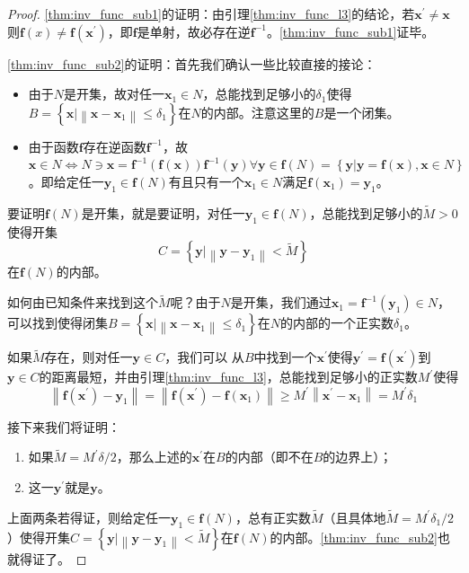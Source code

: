 \documentclass[../main.tex]{subfiles}
\begin{document}
\begin{proof}
    \ref{thm:inv_func_sub1}的证明：由引理\ref{thm:inv_func_l3}的结论，若$\mathbf{x}^\prime\neq\mathbf{x}$则$\mathbf{f}\left(x\right)\neq\mathbf{f}\left(\mathbf{x}^\prime\right)$，即$\mathbf{f}$是单射，故必存在逆$\mathbf{f}^{-1}$。\ref{thm:inv_func_sub1}证毕。

    \ref{thm:inv_func_sub2}的证明：首先我们确认一些比较直接的接论：
    \begin{itemize}
        \item 由于$N$是开集，故对任一$\mathbf{x}_1\in N$，总能找到足够小的$\delta_1$使得$B=\left\{\mathbf{x}|\left\|\mathbf{x}-\mathbf{x}_1\right\|\leq\delta_1\right\}$在$N$的内部。注意这里的$B$是一个闭集。
        \item 由于函数$\mathbf{f}$存在逆函数$\mathbf{f}^{-1}$，故$\mathbf{x}\in N\Leftrightarrow N\ni \mathbf{x}= \mathbf{f}^{-1}\left(\mathbf{f}\left(\mathbf{x}\right)\right)\mathbf{f}^{-1}\left(\mathbf{y}\right)\forall \mathbf{y}\in\mathbf{f}\left(N\right)=\left\{\mathbf{y}|\mathbf{y}=\mathbf{f}\left(\mathbf{x}\right),\mathbf{x}\in N\right\}$。即给定任一$\mathbf{y}_1\in\mathbf{f}\left(N\right)$有且只有一个$\mathbf{x}_1\in N$满足$\mathbf{f}\left(\mathbf{x}_1\right)=\mathbf{y}_1$。
    \end{itemize}

    要证明$\mathbf{f}\left(N\right)$是开集，就是要证明，对任一$\mathbf{y}_1\in\mathbf{f}\left(N\right)$，总能找到足够小的$\widetilde{M}>0$使得开集
    \[C=\left\{\mathbf{y}|\left\|\mathbf{y}-\mathbf{y}_1\right\|<\widetilde{M}\right\}\]
    在$\mathbf{f}\left(N\right)$的内部。

    如何由已知条件来找到这个$\widetilde{M}$呢？由于$N$是开集，我们通过$\mathbf{x}_1=\mathbf{f}^{-1}\left(\mathbf{y}_1\right)\in N$，可以找到使得闭集$B=\left\{\mathbf{x}|\left\|\mathbf{x}-\mathbf{x}_1\right\|\leq\delta_1\right\}$在$N$的内部的一个正实数$\delta_1$。

    如果$\widetilde{M}$存在，则对任一$\mathbf{y}\in C$，我们可以
    从$B$中找到一个$\mathbf{x}^\prime$使得$\mathbf{y}^\prime=\mathbf{f}\left(\mathbf{x}^\prime\right)$到$\mathbf{y}\in C$的距离最短，并由引理\ref{thm:inv_func_l3}，总能找到足够小的正实数$M^\prime$使得
    \[\left\|\mathbf{f}\left(\mathbf{x}^\prime\right)-\mathbf{y}_1\right\|=\left\|\mathbf{f}\left(\mathbf{x}^\prime\right)-\mathbf{f}\left(\mathbf{x}_1\right)\right\|\geq M^\prime\left\|\mathbf{x}^\prime-\mathbf{x}_1\right\|=M^\prime\delta_1
    \]

    接下来我们将证明：
    \begin{enumerate}[label=\roman*]
        \item\label{thm:inv_func_sub2_sub1} 如果$\widetilde{M}=M^\prime\delta/2$，那么上述的$\mathbf{x}^\prime$在$B$的内部（即不在$B$的边界上）；
        \item\label{thm:inv_func_sub2_sub2} 这一$\mathbf{y}^\prime$就是$\mathbf{y}$。
    \end{enumerate}
    上面两条若得证，则给定任一$\mathbf{y}_1\in\mathbf{f}\left(N\right)$，总有正实数$\widetilde{M}$（且具体地$\widetilde{M}=M^\prime\delta_1/2$）使得开集$C=\left\{\mathbf{y}|\left\|\mathbf{y}-\mathbf{y}_1\right\|<\widetilde{M}\right\}$在$\mathbf{f}\left(N\right)$的内部。\ref{thm:inv_func_sub2}也就得证了。


\end{proof}
\end{document}
